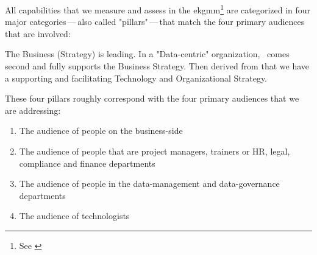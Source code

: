 %
%
\label{sec:the-four-capability-domains}
All capabilities that we measure and assess in the \gls{ekgmm}\footnote{See \autocite{ekgmm}} are categorized
in four major categories\,---\,also called "pillars"\,---\,that match the four primary audiences that are involved:

The Business (Strategy) is leading.
In a "Data-centric" organization,~ comes
second and fully supports the Business Strategy.
Then derived from that we have a supporting and facilitating Technology and Organizational Strategy.

These four pillars roughly correspond with the four primary audiences that we are addressing:

\begin{enumerate}
    \item The audience of people on the business-side
    \item The audience of people that are project managers, trainers or HR, legal, compliance and finance departments
    \item The audience of people in the data-management and data-governance departments
    \item The audience of technologists
\end{enumerate}
